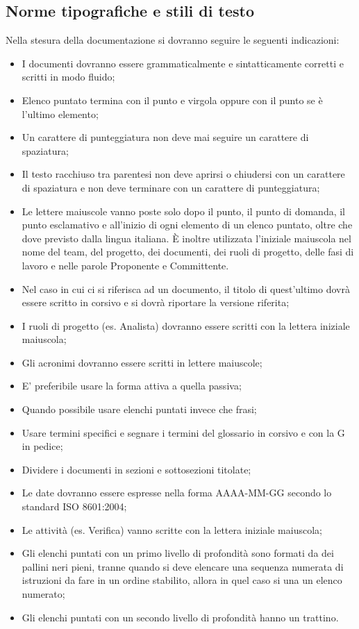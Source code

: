\subsection{Norme tipografiche e stili di testo}
\label{5.4}
Nella stesura della documentazione si dovranno seguire le seguenti indicazioni:
\begin{itemize}
\item I documenti dovranno essere grammaticalmente e sintatticamente corretti e scritti in modo fluido;
\item Elenco puntato termina con il punto e virgola oppure con il punto se è l'ultimo elemento;
\item Un carattere di punteggiatura non deve mai seguire un carattere di spaziatura;
\item Il testo racchiuso tra parentesi non deve aprirsi o chiudersi con un carattere di spaziatura e non deve terminare con un carattere di punteggiatura;
\item Le lettere maiuscole vanno poste solo dopo il punto, il punto di domanda, il punto esclamativo e all'inizio di ogni elemento di un elenco puntato, oltre che dove previsto dalla lingua italiana. È inoltre utilizzata l'iniziale maiuscola nel nome del team, del progetto, dei documenti, dei ruoli di progetto, delle fasi di lavoro e nelle parole Proponente e Committente.
\item Nel caso in cui ci si riferisca ad un documento, il titolo di quest'ultimo dovrà essere scritto in corsivo e si dovrà riportare la versione riferita;
\item I ruoli di progetto (es. Analista) dovranno essere scritti con la lettera iniziale maiuscola;
\item Gli acronimi dovranno essere scritti in lettere maiuscole;
\item E' preferibile usare la forma attiva a quella passiva;
\item Quando possibile usare elenchi puntati invece che frasi;
\item Usare termini specifici e segnare i termini del glossario in corsivo e con la G in pedice;
\item Dividere i documenti in sezioni e sottosezioni titolate;
\item Le date dovranno essere espresse nella forma AAAA-MM-GG secondo lo standard ISO 8601:2004;
\item Le attività (es. Verifica) vanno scritte con la lettera iniziale maiuscola;
\item Gli elenchi puntati con un primo livello di profondità sono formati da dei pallini neri pieni, tranne quando si deve 
elencare una sequenza numerata di istruzioni da fare in un ordine stabilito, allora in quel caso si una un elenco numerato; \item Gli elenchi puntati con un secondo livello di profondità hanno un trattino.
\end{itemize}

